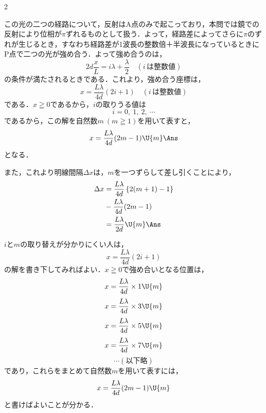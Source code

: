 \begin{multicols}{2}
\begin{komon}
 この光の二つの経路について，反射は$\mathrm{A}$点のみで起こっており，本問では鏡での反射により位相が$\pi$ずれるものとして扱う．よって，経路差によってさらに$\pi$のずれが生じるとき，すなわち経路差が1波長の整数倍＋半波長になっているときに$\mathrm{P}$点で二つの光が強め合う．よって強め合うのは，
       \[2d\frac{x}{L}=i\lambda+\frac{\lambda}{2}\quad(i\,は整数値)\]
       の条件が満たされるときである．これより，強め合う座標は，
       \[x=\frac{L\lambda}{4d}(2i+1)\quad(i\,は整数値)\]
       である．$x\geqq 0$であるから，$i$の取りうる値は
       \[i=0,\ 1,\ 2,\ \cdots\]
       であるから，この解を自然数$m\ (m\geqq 1)$を用いて表すと，
       \[x=\frac{L\lambda}{4d}(2m-1)\U{m}\Ans\]
       となる．

       \hspace{1zw}また，これより明線間隔$\Delta x$は，$m$を一つずらして差し引くことにより，
       \[\begin{aligned}
         \Delta x&=\frac{L\lambda}{4d}\left\{2(m+1)-1\right\}\\
                 &\hspace*{\fill}-\frac{L\lambda}{4d}(2m-1)\\
                 &=\frac{L\lambda}{2d}\U{m}\Ans
       \end{aligned}\]
       \begin{chuu}
       $i$と$m$の取り替えが分かりにくい人は，
       \[x=\frac{L\lambda}{4d}(2i+1)\]
       の解を書き下してみればよい．$x\geqq 0$で強め合いとなる位置は，
       \[x=\frac{L\lambda}{4d}\times 1\U{m}\]
       \[x=\frac{L\lambda}{4d}\times 3\U{m}\]
       \[x=\frac{L\lambda}{4d}\times 5\U{m}\]
       \[x=\frac{L\lambda}{4d}\times 7\U{m}\]
       \[\cdots(以下略)\]
       であり，これらをまとめて自然数$m$を用いて表すには，
       \[x=\frac{L\lambda}{4d}(2m-1)\U{m}\]
       と書けばよいことが分かる．
       \end{chuu}
\end{komon}


\end{multicols}
